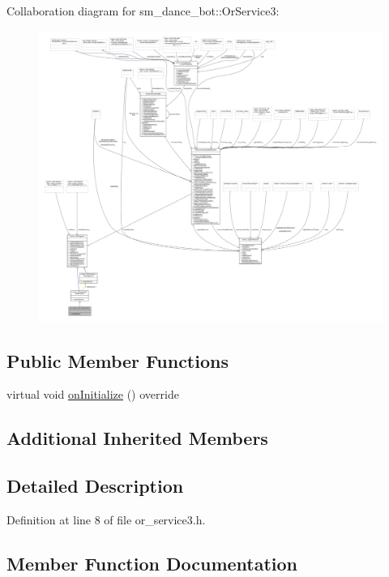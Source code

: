 Collaboration diagram for sm\+\_\+dance\+\_\+bot\+:\+:Or\+Service3\+:
\nopagebreak
\begin{figure}[H]
\begin{center}
\leavevmode
\includegraphics[width=350pt]{classsm__dance__bot_1_1OrService3__coll__graph}
\end{center}
\end{figure}
\subsection*{Public Member Functions}
\begin{DoxyCompactItemize}
\item 
virtual void \hyperlink{classsm__dance__bot_1_1OrService3_a394d93c4a340257b8b1b941adeed8cd9}{on\+Initialize} () override
\end{DoxyCompactItemize}
\subsection*{Additional Inherited Members}


\subsection{Detailed Description}


Definition at line 8 of file or\+\_\+service3.\+h.



\subsection{Member Function Documentation}
